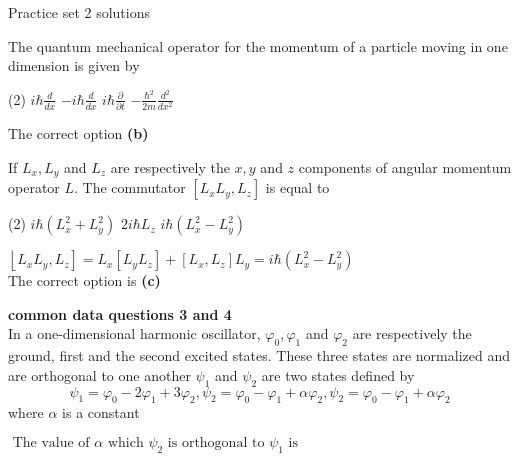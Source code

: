 \newpage
\begin{abox}
	Practice set 2 solutions
	\end{abox}
\begin{enumerate}
\begin{minipage}{\textwidth}
	\item The quantum mechanical operator for the momentum of a particle moving in one dimension is given by
\end{minipage}
\begin{tasks}(2)
	\task[\textbf{A.}] $i \hbar \frac{d}{d x}$
	\task[\textbf{B.}]$-i \hbar \frac{d}{d x}$
	\task[\textbf{C.}]$i \hbar \frac{\partial}{\partial t}$
	\task[\textbf{D.}]$-\frac{\hbar^{2}}{2 m} \frac{d^{2}}{d x^{2}}$
\end{tasks}
\begin{answer}
	The correct option \textbf{(b)}
\end{answer}
\begin{minipage}{\textwidth}
	\item If $L_{x}, L_{y}$ and $L_{z}$ are respectively the $x, y$ and $z$ components of angular momentum operator $L$. The commutator $\left[L_{x} L_{y}, L_{z}\right]$ is equal to
\end{minipage}
\begin{tasks}(2)
	\task[\textbf{A.}] $i \hbar\left(L_{x}^{2}+L_{y}^{2}\right)$
	\task[\textbf{B.}]$2 i \hbar L_{z}$
	\task[\textbf{C.}]$i \hbar\left(L_{x}^{2}-L_{y}^{2}\right)$
\end{tasks}
\begin{answer}
$\left\lfloor L_{x} L_{y}, L_{z}\right]=L_{x}\left[L_{y} L_{z}\right]+\left[L_{x}, L_{z}\right] L_{y}=i \hbar\left(L_{x}^{2}-L_{y}^{2}\right)$\\
The correct option is \textbf{(c)}	
\end{answer}
\textbf{common data questions 3 and 4 }\\
In a one-dimensional harmonic oscillator, $\varphi_{0}, \varphi_{1}$ and $\varphi_{2}$ are respectively the ground, first and the second excited states. These three states are normalized and are orthogonal to one another $\psi_{1}$ and $\psi_{2}$ are two states defined by
$$
\psi_{1}=\varphi_{0}-2 \varphi_{1}+3 \varphi_{2}, \psi_{2}=\varphi_{0}-\varphi_{1}+\alpha \varphi_{2}, \psi_{2}=\varphi_{0}-\varphi_{1}+\alpha \varphi_{2}
$$
where $\alpha$ is a constant\\
\begin{minipage}{\textwidth}
	\item $\text { The value of } \alpha \text { which } \psi_{2} \text { is orthogonal to } \psi_{1} \text { is }$

\end{minipage}
\end{enumerate}
